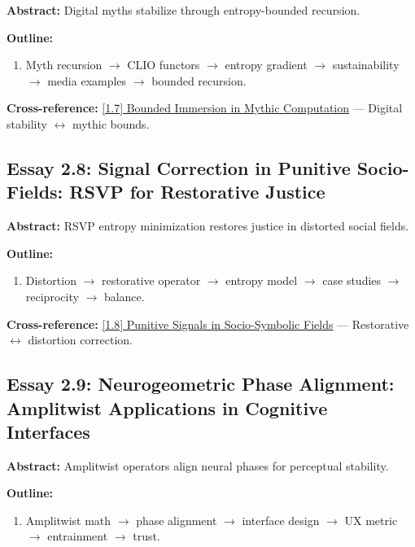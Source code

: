 \documentclass[12pt,a4paper]{article}
\begin{document}
\textbf{Abstract:} Digital myths stabilize through entropy-bounded recursion.

\textbf{Outline:}
\begin{enumerate}
\item Myth recursion $\to$ CLIO functors $\to$ entropy gradient $\to$ sustainability $\to$ media examples $\to$ bounded recursion.
\end{enumerate}

\textbf{Cross-reference:} \hyperref[sec:essay1-7]{[1.7] Bounded Immersion in Mythic Computation} --- Digital stability $\leftrightarrow$ mythic bounds.

\subsection{Essay 2.8: Signal Correction in Punitive Socio-Fields: RSVP for Restorative Justice}
\label{sec:essay2-8}

\textbf{Abstract:} RSVP entropy minimization restores justice in distorted social fields.

\textbf{Outline:}
\begin{enumerate}
\item Distortion $\to$ restorative operator $\to$ entropy model $\to$ case studies $\to$ reciprocity $\to$ balance.
\end{enumerate}

\textbf{Cross-reference:} \hyperref[sec:essay1-8]{[1.8] Punitive Signals in Socio-Symbolic Fields} --- Restorative $\leftrightarrow$ distortion correction.

\subsection{Essay 2.9: Neurogeometric Phase Alignment: Amplitwist Applications in Cognitive Interfaces}
\label{sec:essay2-9}

\textbf{Abstract:} Amplitwist operators align neural phases for perceptual stability.

\textbf{Outline:}
\begin{enumerate}
\item Amplitwist math $\to$ phase alignment $\to$ interface design $\to$ UX metric $\to$ entrainment $\to$ trust.
\end{enumerate}
\end{document}
